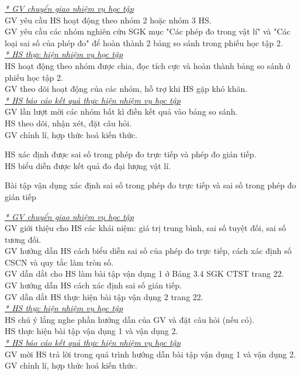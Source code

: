 {\textit{\underline{* GV chuyển giao nhiệm vụ học tập}}\\
	GV yêu cầu HS hoạt động theo nhóm 2 hoặc nhóm 3 HS.\\
	GV yêu cầu các nhóm nghiên cứu SGK mục "Các phép đo trong vật lí" và "Các loại sai số của phép đo" để hoàn thành 2 bảng so sánh trong phiếu học tập 2.\\
	\textit{\underline{* HS thực hiện nhiệm vụ học tập}}\\
	HS hoạt động theo nhóm được chia, đọc tích cực và hoàn thành bảng so sánh ở phiếu học tập 2.\\
	GV theo dõi hoạt động của các nhóm, hỗ trợ khi HS gặp khó khăn.\\
	\textit{\underline{* HS báo cáo kết quả thực hiện nhiệm vụ học tập}}\\
	GV lần lượt mời các nhóm bất kì điền kết quả vào bảng so sánh.\\
	HS theo dõi, nhận xét, đặt câu hỏi.\\
	GV chỉnh lí, hợp thức hoá kiến thức.

}
{
HS xác định được sai số trong phép đo trực tiếp và phép đo gián tiếp.\\
HS biểu diễn được kết quả đo đại lượng vật lí.
}
{Bài tập vận dụng xác định sai số trong phép đo trực tiếp và sai số trong phép đo gián tiếp

}
{\textit{\underline{* GV chuyển giao nhiệm vụ học tập}}\\
	GV giới thiệu cho HS các khái niệm: giá trị trung bình, sai số tuyệt đối, sai số tương đối.\\
	GV hướng dẫn HS cách biểu diễn sai số của phép đo trực tiếp, cách xác định số CSCN và quy tắc làm tròn số.\\
	GV dẫn dắt cho HS làm bài tập vận dụng 1 ở Bảng 3.4 SGK CTST trang 22.\\
	GV hướng dẫn HS cách xác định sai số gián tiếp.\\
	GV dẫn dắt HS thực hiện bài tập vận dụng 2 trang 22.\\
	\textit{\underline{* HS thực hiện nhiệm vụ học tập}}\\
	HS chú ý lắng nghe phần hướng dẫn của GV và đặt câu hỏi (nếu có).\\
	HS thực hiện bài tập vận dụng 1 và vận dụng 2.\\
	\textit{\underline{* HS báo cáo kết quả thực hiện nhiệm vụ học tập}}\\
	GV mời HS trả lời trong quá trình hướng dẫn bài tập vận dụng 1 và vận dụng 2.\\
	GV chỉnh lí, hợp thức hoá kiến thức.
}
